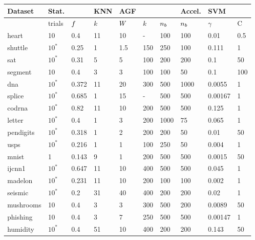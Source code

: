 
\begin{tabular}{|l||ll|l|lll|l|ll|}
	\hline
Dataset	& Stat. & & KNN & AGF & & & Accel. & SVM & \\\hline
 & trials & $f$ & $k$ & $W$ & $k$ & $n_b$ & $n_b$ & $\gamma$ & C\\\hline\hline
	heart & 10 & 0.4 & 11 & 10 & - & 100 & 100 & 0.01 & 0.5 \\
	shuttle & $10^*$ & 0.25 & 1 & 1.5 & 150 & 250 & 100 & 0.111 & 1 \\
	sat & $10^*$ & 0.31 & 5 & 5 & 100 & 200 & 200 & 0.1 & 50\\
	segment & 10 & 0.4 & 3 & 3 & 100 & 100 & 50 & 0.1 & 100 \\
	dna & $10^*$ & 0.372 & 11 & 20 & 300 & 500 & 1000 & 0.0055 & 1 \\
	splice & $10^*$ & 0.685 & 1 & 15 & - & 500 & 500 & 0.00167 & 1 \\
	codrna & $10^*$ & 0.82 & 11 & 10 & 200 & 500 & 500 & 0.125 & 1 \\
	letter & $10^*$ & 0.4 & 1 & 3 & 200 & 1000 & 75 & 0.065 & 1 \\
	pendigits & $10^*$ & 0.318 & 1 & 2 & 200 & 200 & 50 & 0.01 & 50 \\
	usps & $10^*$ & 0.216 & 1 & 1 & 100 & 250 & 50 & 0.004 & 1 \\
	mnist & 1 & 0.143 & 9 & 1 & 200 & 500 & 500 & 0.0015 & 50 \\
	ijcnn1 & $10^*$ & 0.647 & 11 & 10 & 400 & 500 & 500 & 0.045 & 1 \\
	madelon & $10^*$ & 0.231 & 11 & 10 & 200 & 100 & 100 & 0.002 & 1 \\
	seismic & $10^*$ & 0.2 & 31 & 40 & 400 & 200 & 200 & 0.02 & 1 \\
	mushrooms & 10 & 0.4 & 3 & 3 & 300 & 500 & 200 & 0.0089 & 50 \\
	phishing & 10 & 0.4 & 3 & 7 & 250 & 500 & 500 & 0.00147 & 1 \\
	humidity & $10^*$ & 0.4 & 51 & 10 & 400 & 200 & 200 & 0.143 & 50 \\
	\hline
\end{tabular}


